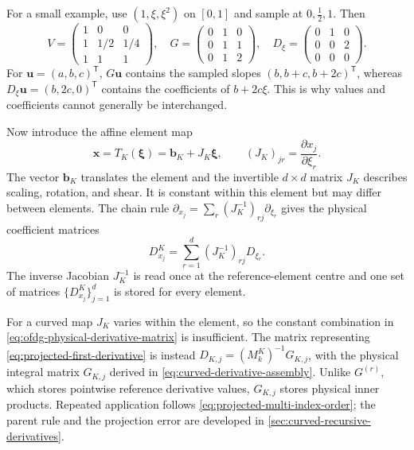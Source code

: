 For a small example, use $(1,\xi,\xi^2)$ on $[0,1]$ and sample at
$0,\tfrac12,1$. Then
\begin{equation}
 V=\begin{pmatrix}1&0&0\\1&1/2&1/4\\1&1&1\end{pmatrix},\quad
 G=\begin{pmatrix}0&1&0\\0&1&1\\0&1&2\end{pmatrix},\quad
 D_\xi=\begin{pmatrix}0&1&0\\0&0&2\\0&0&0\end{pmatrix}.
\end{equation}
For $\boldsymbol u=(a,b,c)^{\mathsf T}$, $G\boldsymbol u$ contains
the sampled slopes $(b,b+c,b+2c)^{\mathsf T}$, whereas
$D_\xi\boldsymbol u=(b,2c,0)^{\mathsf T}$ contains the coefficients
of $b+2c\xi$. This is why values and coefficients cannot generally be
interchanged.

Now introduce the affine element map
\begin{equation}
 \boldsymbol x=T_K(\boldsymbol\xi)=\boldsymbol b_K+J_K\boldsymbol\xi,
 \qquad (J_K)_{jr}=\frac{\partial x_j}{\partial\xi_r}.
 \label{eq:ofdg-affine-map}
\end{equation}
The vector $\boldsymbol b_K$ translates the element and the invertible
$d\times d$ matrix $J_K$ describes scaling, rotation, and shear.
It is constant within this element but may differ between elements.
The chain rule $\partial_{x_j}=\sum_r(J_K^{-1})_{rj}\partial_{\xi_r}$
gives the physical coefficient matrices
\begin{equation}
  D_{x_j}^{K}
  =\sum_{r=1}^d(J_K^{-1})_{rj}D_{\xi_r}.
  \label{eq:ofdg-physical-derivative-matrix}
\end{equation}
The inverse Jacobian $J_K^{-1}$ is read once at the reference-element centre and
one set of matrices $\{D_{x_j}^{K}\}_{j=1}^d$ is stored for every element.

For a curved map $J_K$ varies within the element, so the constant
combination in \cref{eq:ofdg-physical-derivative-matrix} is insufficient.
The matrix representing \cref{eq:projected-first-derivative} is instead
$D_{K,j}=(M_k^K)^{-1}G_{K,j}$, with the physical integral matrix
$G_{K,j}$ derived in \cref{eq:curved-derivative-assembly}.
Unlike $G^{(r)}$, which stores pointwise reference derivative values,
$G_{K,j}$ stores physical inner products. Repeated application follows
\cref{eq:projected-multi-index-order}; the parent rule and the projection
error are developed in \cref{sec:curved-recursive-derivatives}.

